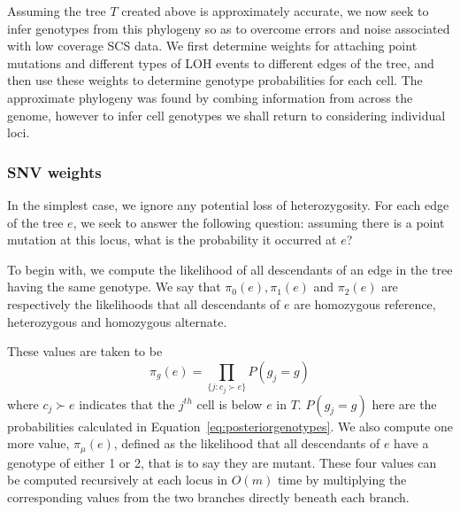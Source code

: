 \documentclass[../../main.tex]{subfiles}
\begin{document}
Assuming the tree $T$ created above is approximately accurate, we now seek to infer genotypes from this phylogeny so as to overcome errors and noise associated with low coverage SCS data.
We first determine weights for attaching point mutations and different types of LOH events to different edges of the tree, and then use these weights to determine genotype probabilities for each cell.
The approximate phylogeny was found by combing information from across the genome, however to infer cell genotypes we shall return to considering individual loci.

\subsubsection*{SNV weights}
In the simplest case, we ignore any potential loss of heterozygosity.
For each edge of the tree $e$, we seek to answer the following question: assuming there is a point mutation at this locus, what is the probability it occurred at $e$?

To begin with, we compute the likelihood of all descendants of an edge in the tree having the same genotype.
We say that $\pi_0(e), \pi_1(e)$ and $\pi_2(e)$ are respectively the likelihoods that all descendants of $e$ are homozygous reference, heterozygous and homozygous alternate.

These values are taken to be
\begin{equation}
\pi_g(e) = \prod_{\{j:c_j\succ e\}} P(g_j = g)
\end{equation}
where $c_j\succ e$ indicates that the $j^{th}$ cell is below $e$ in $T$.
$P(g_j = g)$ here are the probabilities calculated in Equation~\eqref{eq:posteriorgenotypes}.
We also compute one more value, $\pi_\mu(e)$, defined as the likelihood that all descendants of $e$ have a genotype of either 1 or 2, that is to say they are mutant.
These four values can be computed recursively at each locus in $O(m)$ time by multiplying the corresponding values from the two branches directly beneath each branch.
\end{document}
